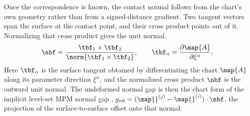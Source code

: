 Once the correspondence is known, the contact normal follows from the chart's own geometry rather than
from a signed-distance gradient. Two tangent vectors span the surface at the contact point, and their
cross product points out of it. Normalizing that cross product gives the unit normal.
%
\begin{equation}\label{eq:jacobian-normal}
\nbf=\frac{\tbf_1\times\tbf_2}{\norm{\tbf_1\times\tbf_2}},\qquad
\tbf_\alpha=\frac{\partial\map{A}}{\partial\xi^\alpha},
\end{equation}
%
Here $\tbf_\alpha$ is the surface tangent obtained by differentiating the chart $\map{A}$ along its
parameter direction $\xi^\alpha$, and the normalized cross product $\nbf$ is the outward unit normal. The
undeformed normal gap is then the chart form of the implicit level-set MPM normal gap
\citep{liu2020implicit}, $g_{n0}=(\map{}^{(j)}-\map{}^{(i)})\cdot\nbf$, the projection of the
surface-to-surface offset onto that normal.

